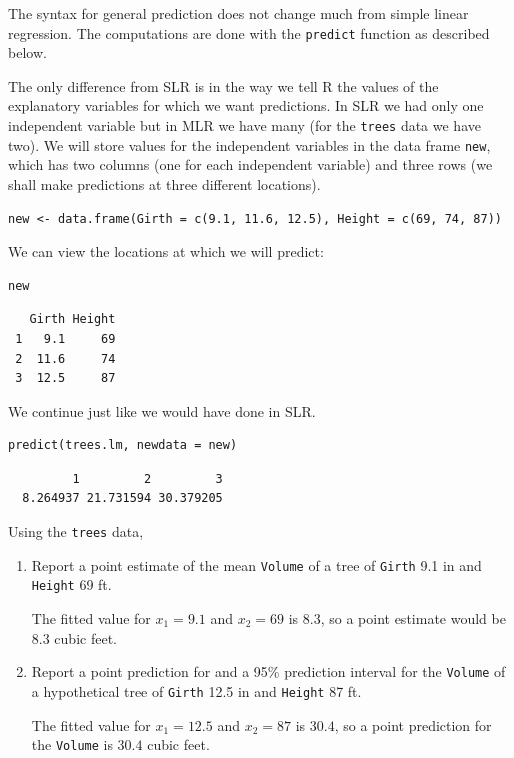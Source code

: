 \documentclass[captions=tableheading]{scrbook}
\begin{document}
The syntax for general prediction does not change much from simple linear regression. The computations are done with the \texttt{predict} function as described below. 

The only difference from SLR is in the way we tell \textsf{R} the values of the explanatory variables for which we want predictions. In SLR we had only one independent variable but in MLR we have many (for the \texttt{trees} data we have two). We will store values for the independent variables in the data frame \texttt{new}, which has two columns (one for each independent variable) and three rows (we shall make predictions at three different locations).


\begin{verbatim}
new <- data.frame(Girth = c(9.1, 11.6, 12.5), Height = c(69, 74, 87))
\end{verbatim}

We can view the locations at which we will predict:


\begin{verbatim}
new
\end{verbatim}

\begin{verbatim}
   Girth Height
 1   9.1     69
 2  11.6     74
 3  12.5     87
\end{verbatim}

We continue just like we would have done in SLR.


\begin{verbatim}
predict(trees.lm, newdata = new)
\end{verbatim}

\begin{verbatim}
         1         2         3 
  8.264937 21.731594 30.379205
\end{verbatim}



\begin{example}
Using the \texttt{trees} data,
\begin{enumerate}
\item Report a point estimate of the mean \texttt{Volume} of a tree of \texttt{Girth} 9.1 in and \texttt{Height} 69 ft.

   The fitted value for \(x_{1}=9.1\) and \(x_{2}=69\) is \(  8.3 \), so a point estimate would be \(  8.3 \) cubic feet.
\item Report a point prediction for and a 95\% prediction interval for the \texttt{Volume} of a hypothetical tree of \texttt{Girth} 12.5 in and \texttt{Height} 87 ft.

   The fitted value for \(x_{1} = 12.5\) and \(x_{2} = 87\) is \(  30.4 \), so a point prediction for the \texttt{Volume} is \(  30.4 \) cubic feet.
\end{enumerate}
\end{example}
\end{document}
